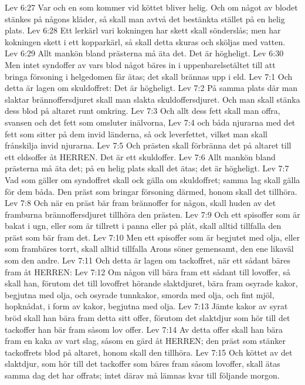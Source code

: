 Lev 6:27  Var och en som kommer vid köttet bliver helig. Och om något av blodet stänkes på någons kläder, så skall man avtvå det bestänkta stället på en helig plats.
Lev 6:28  Ett lerkärl vari kokningen har skett skall sönderslås; men har kokningen skett i ett kopparkärl, så skall detta skuras och sköljas med vatten.
Lev 6:29  Allt mankön bland prästerna må äta det. Det är högheligt.
Lev 6:30  Men intet syndoffer av vars blod något bäres in i uppenbarelsetältet till att bringa försoning i helgedomen får ätas; det skall brännas upp i eld.
Lev 7:1  Och detta är lagen om skuldoffret: Det är högheligt.
Lev 7:2  På samma plats där man slaktar brännoffersdjuret skall man slakta skuldoffersdjuret. Och man skall stänka dess blod på altaret runt omkring.
Lev 7:3  Och allt dess fett skall man offra, svansen och det fett som omsluter inälvorna,
Lev 7:4  och båda njurarna med det fett som sitter på dem invid länderna, så ock leverfettet, vilket man skall frånskilja invid njurarna.
Lev 7:5  Och prästen skall förbränna det på altaret till ett eldsoffer åt HERREN. Det är ett skuldoffer.
Lev 7:6  Allt mankön bland prästerna må äta det; på en helig plats skall det ätas; det är högheligt.
Lev 7:7  Vad som gäller om syndoffret skall ock gälla om skuldoffret; samma lag skall gälla för dem båda. Den präst som bringar försoning därmed, honom skall det tillhöra.
Lev 7:8  Och när en präst bär fram brännoffer for någon, skall huden av det framburna brännoffersdjuret tillhöra den prästen.
Lev 7:9  Och ett spisoffer som är bakat i ugn, eller som är tillrett i panna eller på plåt, skall alltid tillfalla den präst som bär fram det.
Lev 7:10  Men ett spisoffer som är begjutet med olja, eller som frambäres torrt, skall alltid tillfalla Arons söner gemensamt, den ene likaväl som den andre.
Lev 7:11  Och detta är lagen om tackoffret, när ett sådant bäres fram åt HERREN:
Lev 7:12  Om någon vill bära fram ett sådant till lovoffer, så skall han, förutom det till lovoffret hörande slaktdjuret, bära fram osyrade kakor, begjutna med olja, och osyrade tunnkakor, smorda med olja, och fint mjöl, hopknådat, i form av kakor, begjutna med olja.
Lev 7:13  Jämte kakor av syrat bröd skall han bära fram detta sitt offer, förutom det slaktdjur som hör till det tackoffer han bär fram såsom lov offer.
Lev 7:14  Av detta offer skall han bära fram en kaka av vart slag, såsom en gärd åt HERREN; den präst som stänker tackoffrets blod på altaret, honom skall den tillhöra.
Lev 7:15  Och köttet av det slaktdjur, som hör till det tackoffer som bäres fram såsom lovoffer, skall ätas samma dag det har offrats; intet därav må lämnas kvar till följande morgon.
